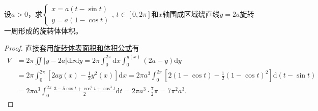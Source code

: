 \documentclass[../../main.tex]{subfiles}%
\begin{document}
\begin{example}
设$a>0$，求$\begin{cases}x=a(t-\sin t)\\y=a(1-\cos t)\end{cases},\,t\in[0,2\pi]$和$x$轴围成区域绕直线$y=2a$旋转一周形成的旋转体体积。
\end{example}
\begin{proof}
直接套用\hyperref[theorem:旋转体表面积和体积公式]{旋转体表面积和体积公式}有
\begin{align*}
V &= 2\pi \iint |y-2a|\mathrm{d}x\mathrm{d}y = 2\pi \int_{0}^{2\pi}\mathrm{d}x \int_{0}^{y(x)} (2a-y)\mathrm{d}y \\
&= 2\pi \int_{0}^{2\pi}\left[2a y(x)-\frac{1}{2}y^2(x)\right]\mathrm{d}x
=2\pi a^3 \int_{0}^{2\pi}\left[2(1-\cos t)-\frac{1}{2}(1-\cos t)^2\right]\mathrm{d}(t-\sin t) \\
&=2\pi a^3 \int_{0}^{2\pi}\frac{3-5\cos t+\cos^2 t+\cos^3 t}{2}\mathrm{d}t
=2\pi a^3\cdot \frac{7}{2}\pi=7\pi^2 a^3.
\end{align*}\end{proof}
\end{document}
